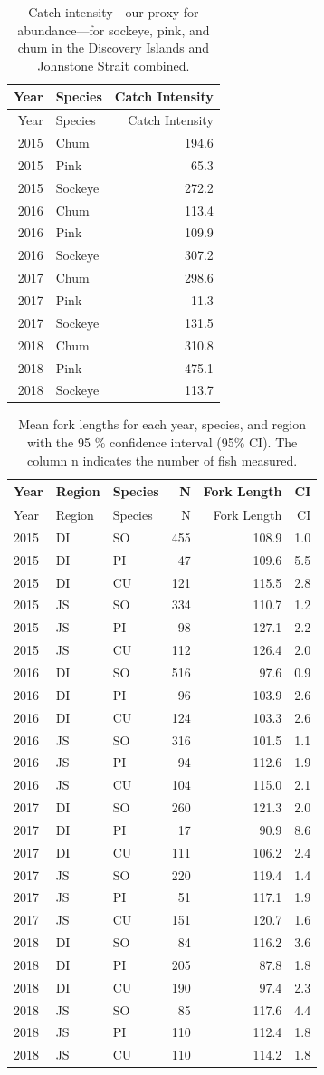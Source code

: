 \documentclass[fleqn,10pt]{wlpeerj} %
\begin{document}
\begin{longtable}[]{@{}rlr@{}}
\caption{\label{tab:catch-intensity-table} Catch intensity---our proxy for abundance---for sockeye, pink, and chum in the Discovery Islands and Johnstone Strait combined.}\tabularnewline
\toprule
Year & Species & Catch Intensity\tabularnewline
\midrule
\endfirsthead
\toprule
Year & Species & Catch Intensity\tabularnewline
\midrule
\endhead
2015 & Chum & 194.6\tabularnewline
2015 & Pink & 65.3\tabularnewline
2015 & Sockeye & 272.2\tabularnewline
2016 & Chum & 113.4\tabularnewline
2016 & Pink & 109.9\tabularnewline
2016 & Sockeye & 307.2\tabularnewline
2017 & Chum & 298.6\tabularnewline
2017 & Pink & 11.3\tabularnewline
2017 & Sockeye & 131.5\tabularnewline
2018 & Chum & 310.8\tabularnewline
2018 & Pink & 475.1\tabularnewline
2018 & Sockeye & 113.7\tabularnewline
\bottomrule
\end{longtable}

\begin{longtable}[]{@{}lllrrr@{}}
\caption{\label{tab:length-table} Mean fork lengths for each year, species, and region with the 95 \% confidence interval (95\% CI). The column n indicates the number of fish measured.}\tabularnewline
\toprule
Year & Region & Species & N & Fork Length & CI\tabularnewline
\midrule
\endfirsthead
\toprule
Year & Region & Species & N & Fork Length & CI\tabularnewline
\midrule
\endhead
2015 & DI & SO & 455 & 108.9 & 1.0\tabularnewline
2015 & DI & PI & 47 & 109.6 & 5.5\tabularnewline
2015 & DI & CU & 121 & 115.5 & 2.8\tabularnewline
2015 & JS & SO & 334 & 110.7 & 1.2\tabularnewline
2015 & JS & PI & 98 & 127.1 & 2.2\tabularnewline
2015 & JS & CU & 112 & 126.4 & 2.0\tabularnewline
2016 & DI & SO & 516 & 97.6 & 0.9\tabularnewline
2016 & DI & PI & 96 & 103.9 & 2.6\tabularnewline
2016 & DI & CU & 124 & 103.3 & 2.6\tabularnewline
2016 & JS & SO & 316 & 101.5 & 1.1\tabularnewline
2016 & JS & PI & 94 & 112.6 & 1.9\tabularnewline
2016 & JS & CU & 104 & 115.0 & 2.1\tabularnewline
2017 & DI & SO & 260 & 121.3 & 2.0\tabularnewline
2017 & DI & PI & 17 & 90.9 & 8.6\tabularnewline
2017 & DI & CU & 111 & 106.2 & 2.4\tabularnewline
2017 & JS & SO & 220 & 119.4 & 1.4\tabularnewline
2017 & JS & PI & 51 & 117.1 & 1.9\tabularnewline
2017 & JS & CU & 151 & 120.7 & 1.6\tabularnewline
2018 & DI & SO & 84 & 116.2 & 3.6\tabularnewline
2018 & DI & PI & 205 & 87.8 & 1.8\tabularnewline
2018 & DI & CU & 190 & 97.4 & 2.3\tabularnewline
2018 & JS & SO & 85 & 117.6 & 4.4\tabularnewline
2018 & JS & PI & 110 & 112.4 & 1.8\tabularnewline
2018 & JS & CU & 110 & 114.2 & 1.8\tabularnewline
\bottomrule
\end{longtable}
\end{document}
